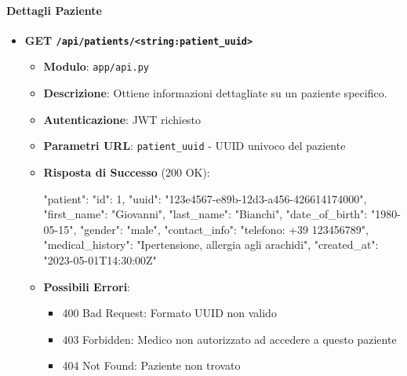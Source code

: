 \documentclass[12pt,a4paper,oneside]{report}
\begin{document}
\paragraph{Dettagli Paziente}
\begin{itemize}
    \item \textbf{GET \texttt{/api/patients/<string:patient\_uuid>}}
          \begin{itemize}
              \item \textbf{Modulo}: \texttt{app/api.py}
              \item \textbf{Descrizione}: Ottiene informazioni dettagliate su un paziente specifico.
              \item \textbf{Autenticazione}: JWT richiesto
              \item \textbf{Parametri URL}: \texttt{patient\_uuid} - UUID univoco del paziente
              \item \textbf{Risposta di Successo} (200 OK):
                    \begin{spverbatim}
                        {
                        "patient": {
                        "id": 1,
                        "uuid": "123e4567-e89b-12d3-a456-426614174000",
                        "first_name": "Giovanni",
                        "last_name": "Bianchi",
                        "date_of_birth": "1980-05-15",
                        "gender": "male",
                        "contact_info": "telefono: +39 123456789",
                        "medical_history": "Ipertensione, allergia agli arachidi",
                        "created_at": "2023-05-01T14:30:00Z"
                        }
                        }
                    \end{spverbatim}
              \item \textbf{Possibili Errori}:
                    \begin{itemize}
                        \item 400 Bad Request: Formato UUID non valido
                        \item 403 Forbidden: Medico non autorizzato ad accedere a questo paziente
                        \item 404 Not Found: Paziente non trovato
                    \end{itemize}
          \end{itemize}
\end{itemize}
\end{document}
